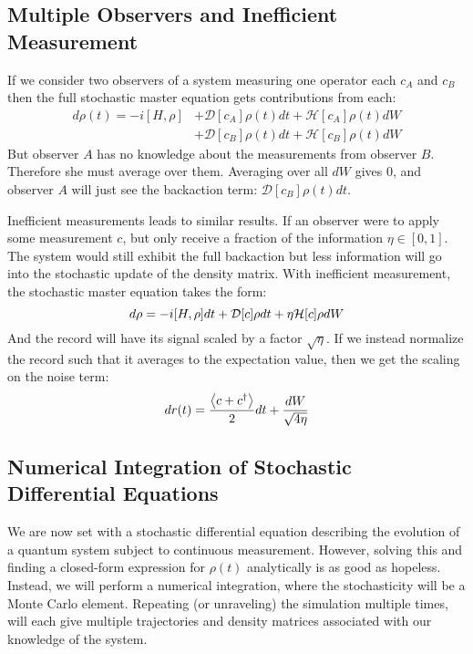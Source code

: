 \subsection{Multiple Observers and Inefficient Measurement}\label{sec:sme_inefficient}
If we consider two observers of a system measuring one operator each $c_A$ and $c_B$ then the full stochastic master equation gets contributions from each:
\begin{align*}
    d\rho(t) = -i[H, \rho] &+ \mathcal{D}[c_A]\rho(t) dt + \mathcal{H}[c_A]\rho(t) dW \\
                           &+ \mathcal{D}[c_B]\rho(t) dt + \mathcal{H}[c_B]\rho(t) dW
\end{align*}
But observer $A$ has no knowledge about the measurements from observer $B$. Therefore she must average over them. Averaging over all $dW$ gives $0$, and observer $A$ will just see the backaction term: $\mathcal{D}[c_B] \rho(t) dt$. 

Inefficient measurements leads to similar results. If an observer were to apply some measurement $c$, but only receive a fraction of the information $\eta\in[0, 1]$. The system would still exhibit the full backaction but less information will go into the stochastic update of the density matrix. With inefficient measurement, the stochastic master equation takes the form:
\begin{equation}
    d\rho = -i \comm{H}{\rho}dt + \mathcal{D}[c]\rho dt + \eta \mathcal{H}[c] \rho dW
\end{equation}
And the record will have its signal scaled by a factor $\sqrt{\eta}$.  If we instead normalize the record such that it averages to the expectation value, then we get the scaling on the noise term:
\begin{equation}
    dr(t) = \frac{\expval{c + c^\dagger}}{2}dt + \frac{dW}{\sqrt{4\eta}}
\end{equation}

\subsection{Numerical Integration of Stochastic Differential Equations}
We are now set with a stochastic differential equation describing the evolution of a quantum system subject to continuous measurement. However, solving this and finding a closed-form expression for $\rho(t)$ analytically is as good as hopeless. Instead, we will perform a numerical integration, where the stochasticity will be a Monte Carlo element. Repeating (or unraveling) the simulation multiple times, will each give multiple trajectories and density matrices associated with our knowledge of the system. 


